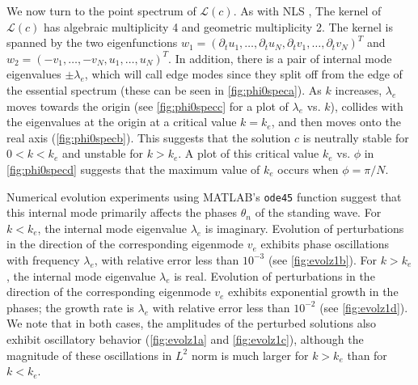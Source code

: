 \documentclass[11pt,reqno]{amsart}
\def\calL{{\mathcal L}}
\begin{document}
We now turn to the point spectrum of $\calL(c)$. As with NLS \cite[Chapter 2.1.1.1]{Kevrekidis2009},
The kernel of $\calL(c)$ has algebraic multiplicity 4 and geometric multiplicity 2. The kernel is spanned by the two eigenfunctions 
$w_1 = (\partial_t u_1, \dots, \partial_t u_N, \partial_t v_1, \dots, \partial_t v_N )^T$ and 
$w_2 = (-v_1, \dots, -v_N, u_1, \dots, u_N )^T$. In addition, there is a pair of internal mode eigenvalues $\pm \lambda_e$, which will call edge modes since they split off from the edge of the essential spectrum (these can be seen in \cref{fig:phi0speca}). As $k$ increases, $\lambda_e$ moves towards the origin (see \cref{fig:phi0specc} for a plot of $\lambda_e$ vs. $k$), collides with the eigenvalues at the origin at a critical value $k = k_e$, and then moves onto the real axis (\cref{fig:phi0specb}). This suggests that the solution $c$ is neutrally stable for $0 < k < k_e$ and unstable for $k > k_e$. A plot of this critical value $k_e$ vs. $\phi$ in \cref{fig:phi0specd} suggests that the maximum value of $k_e$ occurs when $\phi = \pi/N$.

Numerical evolution experiments using MATLAB's \texttt{ode45} function suggest that this internal mode primarily affects the phases $\theta_n$ of the standing wave. For $k < k_e$, the internal mode eigenvalue $\lambda_e$ is imaginary. Evolution of perturbations in the direction of the corresponding eigenmode $v_e$ exhibits phase oscillations with frequency $\lambda_e$, with relative error less than $10^{-3}$ (see \cref{fig:evolz1b}). For $k > k_e$, the internal mode eigenvalue $\lambda_e$ is real. Evolution of perturbations in the direction of the corresponding eigenmode $v_e$ exhibits exponential growth in the phases; the growth rate is $\lambda_e$ with relative error less than $10^{-2}$ (see \cref{fig:evolz1d}). We note that in both cases, the amplitudes of the perturbed solutions also exhibit oscillatory behavior (\cref{fig:evolz1a} and \cref{fig:evolz1c}), although the magnitude of these oscillations in $L^2$ norm is much larger for $k > k_e$ than for $k < k_e$.
\end{document}
